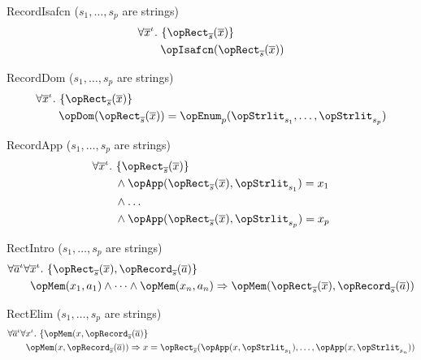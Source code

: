 \documentclass[11pt, a4paper, oneside]{article}
\begin{document}
\begin{axioms}
\item[RecordIsafcn (\rm$s_1,\dots,s_p$ are strings)] \[
        \begin{aligned}
            &\forall \overline{x}^\idv.\, \st{ \opRect_{\overline{s}}(\overline{x}) } \\
            &\qquad \opIsafcn(\opRect_{\overline{s}}(\overline{x}))
        \end{aligned}
    \]

\item[RecordDom (\rm$s_1,\dots,s_p$ are strings)] \[
        \begin{aligned}
            &\forall \overline{x}^\idv.\, \st{ \opRect_{\overline{s}}(\overline{x}) } \\
            &\qquad \opDom(\opRect_{\overline{s}}(\overline{x})) = \opEnum_p(\opStrlit_{s_1}, \dots, \opStrlit_{s_p})
        \end{aligned}
    \]

\item[RecordApp (\rm$s_1,\dots,s_p$ are strings)] \[
        \begin{aligned}
            &\forall \overline{x}^\idv.\, \st{ \opRect_{\overline{s}}(\overline{x}) } \\
            &\qquad \wedge \opApp(\opRect_{\overline{s}}(\overline{x}), \opStrlit_{s_1}) = x_1 \\
            &\qquad \wedge \dots \\
            &\qquad \wedge \opApp(\opRect_{\overline{s}}(\overline{x}), \opStrlit_{s_p}) = x_p
        \end{aligned}
    \]

\item[RectIntro (\rm$s_1,\dots,s_p$ are strings)] \[
        \begin{aligned}
            &\forall \overline{a}^\idv \forall \overline{x}^\idv.\, \st{ \opRect_{\overline{s}}(\overline{x}), \opRecord_{\overline{s}}(\overline{a}) } \\
            &\qquad \opMem(x_1, a_1) \wedge \dots \wedge \opMem(x_n, a_n) \imp \opMem(\opRect_{\overline{s}}(\overline{x}), \opRecord_{\overline{s}}(\overline{a}))
        \end{aligned}
    \]

\item[RectElim (\rm$s_1,\dots,s_p$ are strings)] \[
        \begin{aligned}
            &\forall \overline{a}^\idv \forall x^\idv.\, \st{ \opMem(x, \opRecord_{\overline{s}}(\overline{a}) } \\
            &\qquad \opMem(x, \opRecord_{\overline{s}}(\overline{a})) \imp x = \opRect_{\overline{s}}(\opApp(x, \opStrlit_{s_1}), \dots, \opApp(x, \opStrlit_{s_n}))
        \end{aligned}
    \]

\end{axioms}
\end{document}
